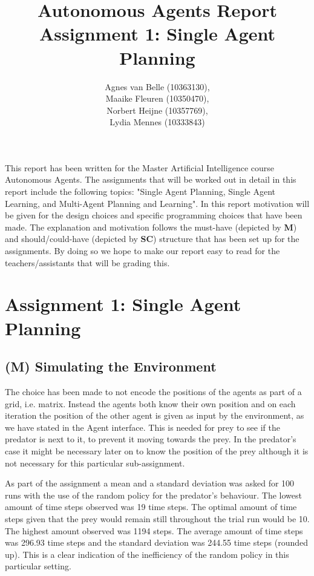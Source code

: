 \documentclass{article}
\begin{document}
\title{Autonomous Agents Report\\Assignment 1: Single Agent Planning}
\author{Agnes van Belle (10363130), \\Maaike Fleuren (10350470), \\Norbert Heijne (10357769), \\Lydia Mennes (10333843)}
\maketitle

This report has been written for the Master Artificial Intelligence course Autonomous Agents. The assignments that will be worked out in detail in this report include the following topics: "Single Agent Planning, Single Agent Learning, and Multi-Agent Planning and Learning". In this report motivation will be given for the design choices and specific programming choices that have been made. The explanation and motivation follows the must-have (depicted by \textbf{M}) and should/could-have (depicted by \textbf{SC}) structure that has been set up for the assignments. By doing so we hope to make our report easy to read for the teachers/assistants that will be grading this.

\section{Assignment 1: Single Agent Planning}

\subsection{(M) Simulating the Environment}
The choice has been made to not encode the positions of the agents as part of a grid, i.e. matrix. Instead the agents both know their own position and on each iteration the position of the other agent is given as input by the environment, as we have stated in the Agent interface. This is needed for prey to see if the predator is next to it, to prevent it moving towards the prey. In the predator's case it might be necessary later on to know the position of the prey although it is not necessary for this particular sub-assignment.

As part of the assignment a mean and a standard deviation was asked for 100 runs with the use of the random policy for the predator's behaviour. The lowest amount of time steps observed was 19 time steps. The optimal amount of time steps given that the prey would remain still throughout the trial run would be 10. The highest amount observed was 1194 steps. The average amount of time steps was 296.93 time steps and the standard deviation was 244.55 time steps (rounded up). This is a clear indication of the inefficiency of the random policy in this particular setting. 
\end{document}
